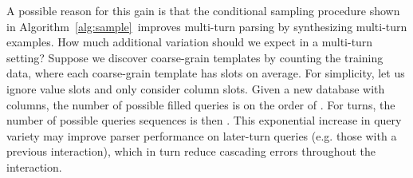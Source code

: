 \documentclass[11pt,a4paper]{article}
\begin{document}
A possible reason for this gain is that the conditional sampling procedure shown in Algorithm~\ref{alg:sample}~improves multi-turn parsing by synthesizing multi-turn examples.
How much additional variation should we expect in a multi-turn setting?
Suppose we discover  coarse-grain templates by counting the training data, where each coarse-grain template has  slots on average.
For simplicity, let us ignore value slots and only consider column slots.
Given a new database with  columns, the number of possible filled queries is on the order of .
For  turns, the number of possible queries sequences is then .
This exponential increase in query variety may improve parser performance on later-turn queries (e.g. those with a previous interaction), which in turn reduce cascading errors throughout the interaction.
\end{document}
